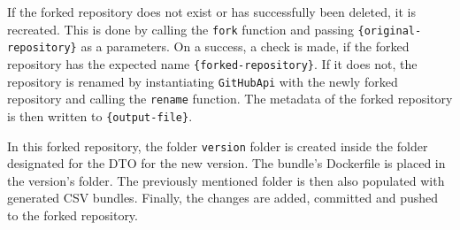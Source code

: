 If the forked repository does not exist or has successfully been deleted, it is recreated.
This is done by calling the \verb|fork| function and passing \verb|{original-repository}| as a parameters.
On a success, a check is made, if the forked repository has the expected name \verb|{forked-repository}|.
If it does not, the repository is renamed by instantiating \verb|GitHubApi| with the newly forked repository and calling the \verb|rename| function.
The metadata of the forked repository is then written to \verb|{output-file}|.

In this forked repository, the folder \verb|version| folder is created inside the folder designated for the DTO for the new version.
The bundle's Dockerfile is placed in the version's folder.
The previously mentioned folder is then also populated with generated CSV bundles.
Finally, the changes are added, committed and pushed to the forked repository.
